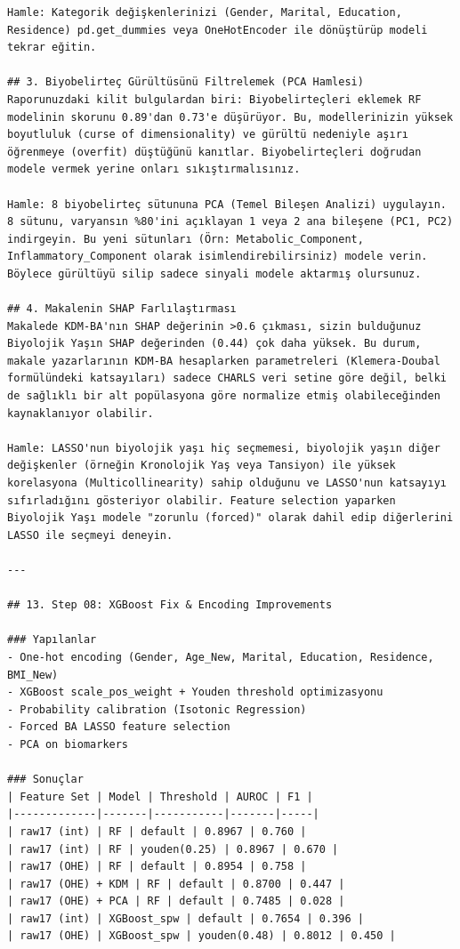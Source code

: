 ﻿\documentclass[11pt,a4paper]{article}
\begin{document}
\begin{verbatim}
Hamle: Kategorik değişkenlerinizi (Gender, Marital, Education, Residence) pd.get_dummies veya OneHotEncoder ile dönüştürüp modeli tekrar eğitin.

## 3. Biyobelirteç Gürültüsünü Filtrelemek (PCA Hamlesi)
Raporunuzdaki kilit bulgulardan biri: Biyobelirteçleri eklemek RF modelinin skorunu 0.89'dan 0.73'e düşürüyor. Bu, modellerinizin yüksek boyutluluk (curse of dimensionality) ve gürültü nedeniyle aşırı öğrenmeye (overfit) düştüğünü kanıtlar. Biyobelirteçleri doğrudan modele vermek yerine onları sıkıştırmalısınız.

Hamle: 8 biyobelirteç sütununa PCA (Temel Bileşen Analizi) uygulayın. 8 sütunu, varyansın %80'ini açıklayan 1 veya 2 ana bileşene (PC1, PC2) indirgeyin. Bu yeni sütunları (Örn: Metabolic_Component, Inflammatory_Component olarak isimlendirebilirsiniz) modele verin. Böylece gürültüyü silip sadece sinyali modele aktarmış olursunuz.

## 4. Makalenin SHAP Farlılaştırması
Makalede KDM-BA'nın SHAP değerinin >0.6 çıkması, sizin bulduğunuz Biyolojik Yaşın SHAP değerinden (0.44) çok daha yüksek. Bu durum, makale yazarlarının KDM-BA hesaplarken parametreleri (Klemera-Doubal formülündeki katsayıları) sadece CHARLS veri setine göre değil, belki de sağlıklı bir alt popülasyona göre normalize etmiş olabileceğinden kaynaklanıyor olabilir.

Hamle: LASSO'nun biyolojik yaşı hiç seçmemesi, biyolojik yaşın diğer değişkenler (örneğin Kronolojik Yaş veya Tansiyon) ile yüksek korelasyona (Multicollinearity) sahip olduğunu ve LASSO'nun katsayıyı sıfırladığını gösteriyor olabilir. Feature selection yaparken Biyolojik Yaşı modele "zorunlu (forced)" olarak dahil edip diğerlerini LASSO ile seçmeyi deneyin.

---

## 13. Step 08: XGBoost Fix & Encoding Improvements

### Yapılanlar
- One-hot encoding (Gender, Age_New, Marital, Education, Residence, BMI_New)
- XGBoost scale_pos_weight + Youden threshold optimizasyonu
- Probability calibration (Isotonic Regression)
- Forced BA LASSO feature selection
- PCA on biomarkers

### Sonuçlar
| Feature Set | Model | Threshold | AUROC | F1 |
|-------------|-------|-----------|-------|-----|
| raw17 (int) | RF | default | 0.8967 | 0.760 |
| raw17 (int) | RF | youden(0.25) | 0.8967 | 0.670 |
| raw17 (OHE) | RF | default | 0.8954 | 0.758 |
| raw17 (OHE) + KDM | RF | default | 0.8700 | 0.447 |
| raw17 (OHE) + PCA | RF | default | 0.7485 | 0.028 |
| raw17 (int) | XGBoost_spw | default | 0.7654 | 0.396 |
| raw17 (OHE) | XGBoost_spw | youden(0.48) | 0.8012 | 0.450 |


\end{verbatim}
\end{document}
